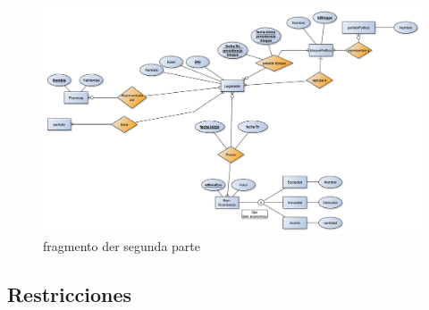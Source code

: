 \documentclass[10pt, a4paper]{article}
\begin{document}
		\begin{figure}[ht]
		    \includegraphics[scale=.30]{./imagenes/DERParteDeArriba.pdf}
		    \caption{fragmento der segunda parte} 
		    \label{fig:derparte2}
		\end{figure}

	\newpage
	\subsection{Restricciones}
	
		
\end{document}
